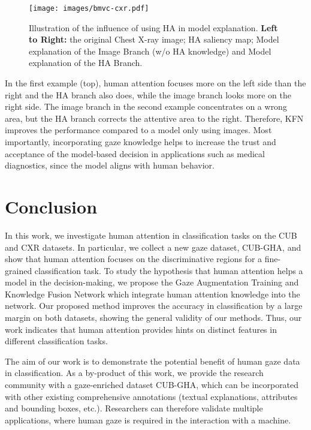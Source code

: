 \documentclass{bmvc2k}
\begin{document}
\begin{wrapfigure}{r}{0.45\textwidth}
  \begin{center}
   \vspace*{-0.5cm}
    \texttt{[image: images/bmvc-cxr.pdf]}
  \end{center}
  \caption{Illustration of the influence of using HA in model explanation. \textbf{Left to Right:} the original Chest X-ray image; HA saliency map; Model explanation of the Image Branch (w/o HA knowledge) and Model explanation of the HA Branch. }
  \label{fig:cxr}
   \vspace*{-.2cm}
\end{wrapfigure}
In the first example (top), human attention focuses more on the left side than the right and the HA branch also does, while the image branch looks more on the right side. The image branch in the second example concentrates on a wrong area, but the HA branch corrects the attentive area to the right. Therefore, KFN improves the performance compared to a model only using images. Most importantly, incorporating gaze knowledge helps to increase the trust and acceptance of the model-based decision in applications such as medical diagnostics, since the model aligns with human behavior. 











\section{Conclusion}
\label{sec:conclusion}
In this work, we investigate human attention in classification tasks on the CUB and CXR datasets. In particular, we collect a new gaze dataset, CUB-GHA, and show that human attention focuses on the discriminative regions for a fine-grained classification task. To study the hypothesis that human attention helps a model in the decision-making, we propose the Gaze Augmentation Training and Knowledge Fusion Network which integrate human attention knowledge into the network. Our proposed method improves the accuracy in classification by a large margin on both datasets, showing the general validity of our methods. Thus, our work indicates that human attention provides hints on distinct features in different classification tasks. 

The aim of our work is to demonstrate the potential benefit of human gaze data in classification. As a by-product of this work, we provide the research community with a gaze-enriched dataset CUB-GHA, which can be incorporated with other existing comprehensive annotations (textual explanations, attributes and bounding boxes, etc.). Researchers can therefore validate multiple applications, where human gaze is required in the interaction with a machine.
\end{document}
